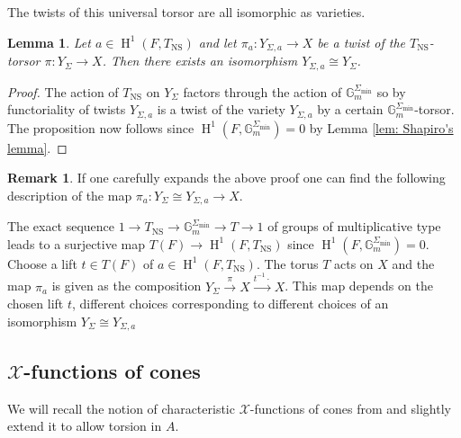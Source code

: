 \documentclass[a4paper,11pt,reqno]{amsart}
\newcommand{\G}{\mathbb{G}}
\DeclareMathOperator{\NS}{NS}
\DeclareMathOperator{\HH}{H}
\newtheorem{lemma}[theorem]{Lemma}
\theoremstyle{definition}
\newtheorem{remark}[theorem]{Remark}
\begin{document}
The twists of this universal torsor are all isomorphic as varieties.
\begin{lemma}\label{lem:Twists of universal torsors of toric varieties}
	Let $a \in \HH^1(F, T_{\NS})$ and let $\pi_{a}: Y_{\Sigma, a} \to X$ be a twist of the $T_{\NS}$-torsor $\pi: Y_{\Sigma} \to X$. Then there exists an isomorphism $Y_{\Sigma, a} \cong Y_{\Sigma}$.
	\end{lemma}
\begin{proof}
	The action of $T_{\NS}$ on $Y_{\Sigma}$ factors through the action of $\G_m^{\Sigma_{\min}}$ so by functoriality of twists $Y_{\Sigma, a}$ is a twist of the variety $Y_{\Sigma, a}$ by a certain $\G_m^{\Sigma_{\min}}$-torsor. The proposition now follows since $\HH^1(F, \G_m^{\Sigma_{\min}}) = 0$ by Lemma \ref{lem: Shapiro's lemma}.
\end{proof}
\begin{remark}
	If one carefully expands the above proof one can find the following description of the map $\pi_{a}: Y_{\Sigma} \cong Y_{\Sigma, a} \to X$.
	
	The exact sequence $1 \to T_{\NS} \to \G_m^{\Sigma_{\min}} \to T \to 1$ of groups of multiplicative type leads to a surjective map $T(F) \to \HH^1(F, T_{\NS})$ since $\HH^1(F, \G_m^{\Sigma_{\min}})= 0$. Choose a lift $t \in T(F)$ of $a \in \HH^1(F, T_{\NS})$. The torus $T$ acts on $X$ and the map $\pi_a$ is given as the composition $Y_{\Sigma} \xrightarrow{\pi} X \xrightarrow{t^{-1} \cdot} X$. This map depends on the chosen lift $t$, different choices corresponding to different choices of an isomorphism $Y_{\Sigma} \cong Y_{\Sigma, a}$
\end{remark}
\subsection{\texorpdfstring{$\mathcal{X}$}{X}-functions of cones}
We will recall the notion of characteristic $\mathcal{X}$-functions of cones from \cite[\S 5]{Batyrev1998Manin} and slightly extend it to allow torsion in $A$.
\end{document}

